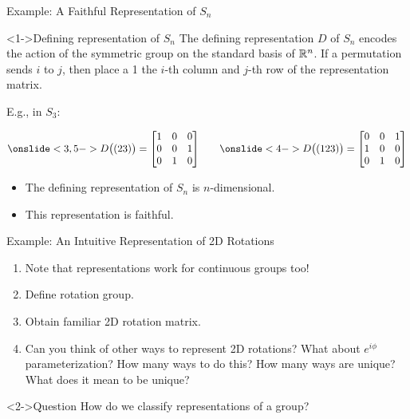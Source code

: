 \documentclass[compress,aspectratio=169,10pt,usenames,dvipsnames]{beamer}
\begin{document}

\begin{frame}{Example: A Faithful Representation of $S_n$}
\vfill

\begin{block}<1->{Defining representation of $S_n$}
The defining representation $D$ of $S_n$ encodes the action of the symmetric group on the standard basis of $\mathbb{R}^n$. If a permutation sends $i$ to $j$, then place a 1 the $i$-th column and $j$-th row of the representation matrix.
\end{block}
\vfill

E.g., in $S_3$:

\begin{align*}
  \onslide<3,5->{D\big((23)\big) = \begin{bmatrix} 1 & 0 & 0 \\ 0 & 0 & 1 \\ 0 & 1 & 0 \end{bmatrix}} \qquad
  \onslide<4->{D\big((123)\big) = \begin{bmatrix} 0 & 0 & 1 \\ 1 & 0 & 0 \\ 0 & 1 & 0 \end{bmatrix}}
\end{align*}
\vfill

\begin{itemize}
  \item<5-> The defining representation of $S_n$ is $n$-dimensional.
  \item<6-> This representation is faithful.
\end{itemize}

\vfill

\end{frame}


\begin{frame}{Example: An Intuitive Representation of 2D Rotations}

\begin{enumerate}
  \item Note that representations work for continuous groups too!
  \item Define rotation group.
  \item Obtain familiar 2D rotation matrix.
  \item Can you think of other ways to represent 2D rotations? What about $e^{i\phi}$ parameterization? How many ways to do this? How many ways are unique? What does it mean to be unique?
\end{enumerate}

\vfill

\begin{block}<2->{Question}
  How do we classify representations of a group?
\end{block}

\vfill

\end{frame}
\end{document}

